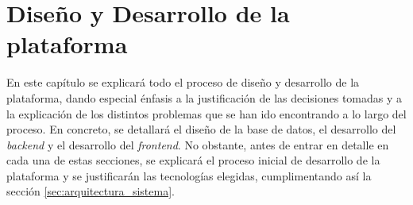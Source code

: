 \chapter{Diseño y Desarrollo de la plataforma}
\label{chap:diseno_desarrollo}

En este capítulo se explicará todo el proceso de diseño y desarrollo de la plataforma, dando especial énfasis a la justificación de las decisiones tomadas y a la explicación de los distintos problemas que se han ido encontrando a lo largo del proceso. En concreto, se detallará el diseño de la base de datos, el desarrollo del \textit{backend} y el desarrollo del \textit{frontend}. No obstante, antes de entrar en detalle en cada una de estas secciones, se explicará el proceso inicial de desarrollo de la plataforma y se justificarán las tecnologías elegidas, cumplimentando así la sección \ref{sec:arquitectura_sistema}.







